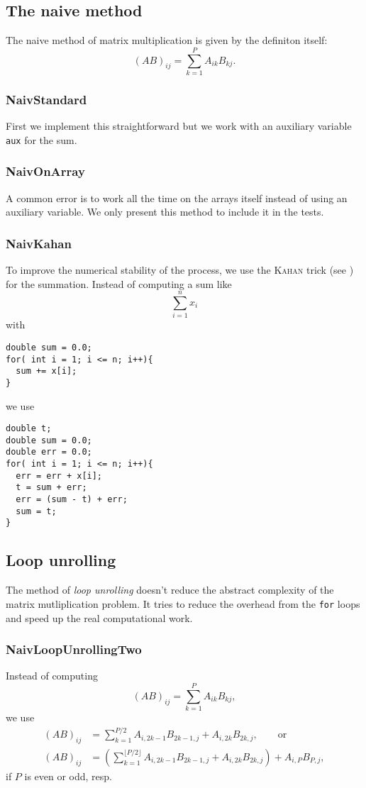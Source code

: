 \documentclass{amsart}
\newcommand{\CODE}[2]{}
\begin{document}
\subsection{The naive method} The naive method of matrix multiplication is given by the definiton itself:
\[(AB)_{ij}=\sum_{k=1}^P A_{ik}B_{k j}.\]

\subsubsection{NaivStandard} First we implement this straightforward but we work with an auxiliary variable \texttt{aux} for the sum.
\CODE{NaivStandard.c}{3}

\subsubsection{NaivOnArray} A common error is to work all the time on the arrays itself instead of using an auxiliary variable.  We only present this method to include it in the tests.
\CODE{NaivOnArray.c}{3}

\subsubsection{NaivKahan} To improve the numerical stability of the process, we use the \textsc{Kahan} trick (see \cite{kahan}) for the summation.
Instead of computing a sum like
\[\sum_{i=1}^n x_i\]
with
\begin{verbatim}
double sum = 0.0;
for( int i = 1; i <= n; i++){
  sum += x[i];
}
\end{verbatim}
we use
\begin{verbatim}
double t;
double sum = 0.0;
double err = 0.0;
for( int i = 1; i <= n; i++){
  err = err + x[i];
  t = sum + err;
  err = (sum - t) + err;
  sum = t;
}
\end{verbatim}

\CODE{NaivKahan.c}{8}

\subsection{Loop unrolling}

The method of \emph{loop unrolling} doesn't reduce the abstract complexity of the matrix mutliplication problem. It tries to reduce the overhead from the \texttt{for} loops and speed up the real computational work.

\subsubsection{NaivLoopUnrollingTwo} Instead of computing
\[
(AB)_{ij}=\sum_{k=1}^P A_{ik}B_{kj},
\]
we use
\begin{align*}
(AB)_{ij} &=\sum_{k=1}^{P/2} A_{i,2k-1}B_{2k-1,j} + A_{i,2k}B_{2k,j}, \qquad \text{or}\\
(AB)_{ij} & =\left(\sum_{k=1}^{\lfloor P/2 \rfloor} A_{i,2k-1}B_{2k-1,j} + A_{i,2k}B_{2k,j}\right)
+ A_{i,P}B_{P,j},
\end{align*}
if $P$ is even or odd, resp.
\end{document}

